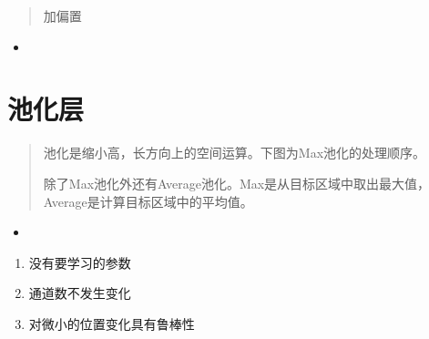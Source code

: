 \documentclass[letterpaper,10pt,english]{sphinxmanual}
\begin{document}
\begin{DUlineblock}{0em}
\item[] 
\end{DUlineblock}
\begin{quote}

加偏置

\end{quote}
\begin{itemize}
\item {} 

\end{itemize}
\begin{quote}

\end{quote}

\begin{DUlineblock}{0em}
\item[] 
\end{DUlineblock}


\section{池化层}
\label{\detokenize{_u5377_u79ef_u795e_u7ecf_u7f51_u7edc:id4}}\begin{quote}

池化是缩小高，长方向上的空间运算。下图为Max池化的处理顺序。


除了Max池化外还有Average池化。Max是从目标区域中取出最大值，Average是计算目标区域中的平均值。
\end{quote}
\begin{itemize}
\item {} 

\end{itemize}
\begin{enumerate}
\item {} 
没有要学习的参数

\item {} 
通道数不发生变化

\item {} 
对微小的位置变化具有鲁棒性

\end{enumerate}
\end{document}
